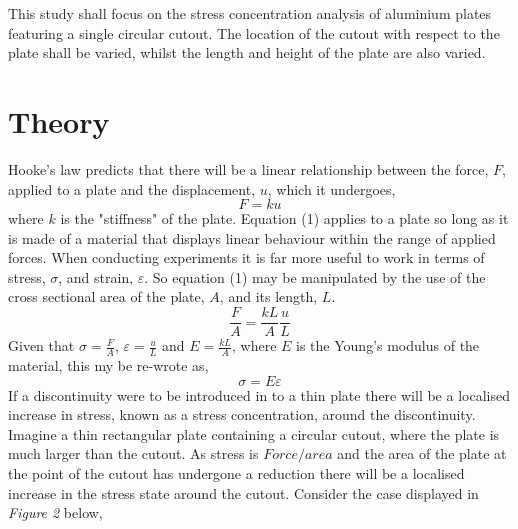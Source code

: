 \documentclass[11pt,twocolumn]{article} %
\begin{document}
\linebreak\par
This study shall focus on the stress concentration analysis of aluminium plates featuring a single circular cutout. The location of the cutout with respect to the plate shall be varied, whilst the length and height of the plate are also varied.

\section{Theory} %
Hooke's law predicts that there will be a linear relationship between the force, $F$, applied to a plate and the displacement, $u$, which it undergoes,
\begin{equation} %
	F = ku
\end{equation}
where $k$ is the "stiffness" of the plate. Equation (1) applies  to a plate so long as it is made of a material that displays linear behaviour within  the range of applied forces. When conducting experiments it is far more useful to work in terms of stress, $\sigma$, and strain, $\varepsilon$. So equation (1) may be manipulated by the use of the cross sectional area of the plate, $A$, and its length, $L$.
\begin{equation} %
	\frac{F}{A} = \frac{kL}{A}\frac{u}{L}
\end{equation}
Given that $\sigma = \frac{F}{A}$, $\varepsilon = \frac{u}{L}$ and $E = \frac{kL}{A}$, where $E$ is the Young's modulus of the material, this my be re-wrote as,
\begin{equation} %
	\sigma = E \varepsilon
\end{equation}
If a discontinuity were to be introduced in to a thin plate \cite{plates} there will be a localised increase in stress, known as a stress concentration, around the discontinuity. Imagine a thin rectangular plate containing a circular cutout, where the plate is much larger than the cutout. As stress is $Force/area$ and the area of the plate at the point of the cutout has undergone a reduction there will be a localised increase in the stress state around the cutout. Consider the case displayed in \textit{Figure 2} below, 
\end{document}

